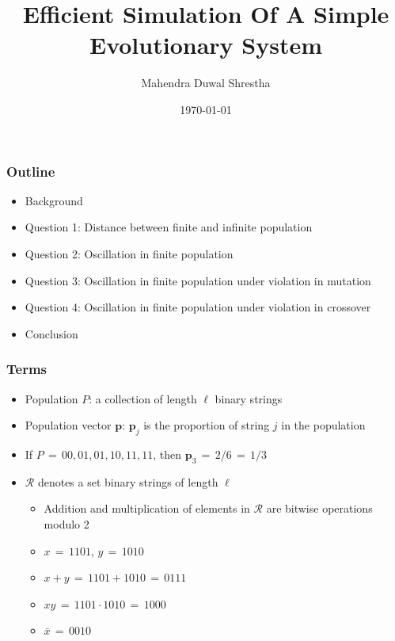 \documentclass[aspectratio=169]{beamer}
\title{Efficient Simulation Of A Simple Evolutionary System}
\author{Mahendra Duwal Shrestha}
\institute{The University Of Tenessee}
\date{\today}
\begin{document}
  \begin{frame}
    \titlepage
  \end{frame}

  \begin{frame}
    \frametitle{Outline}
    \begin{itemize}%
      \item{Background}
      \item{Question 1: Distance between finite and infinite population}
      \item{Question 2: Oscillation in finite population}
      \item{Question 3: Oscillation in finite population under violation in mutation}
      \item{Question 4: Oscillation in finite population under violation in crossover}
      \item{Conclusion}
    \end{itemize}
  \end{frame}

  \begin{frame}
    \frametitle{Terms}
    \begin{itemize}
      \item{Population $P$: a collection of length $\ell$ binary strings}
      \item{Population vector $\bm{p}$: $\bm{p}_j$ is the proportion of string $j$ in the population}
      \item{If $P \,=\, {00, 01, 01, 10, 11, 11}$, then $\bm{p}_3 \,=\, 2/6 \,=\, 1/3$}
      \item{$\mathcal{R}$ denotes a set binary strings of length $\ell$ }
      \begin{itemize}
	\item{Addition and multiplication of elements in $\mathcal{R}$ are bitwise operations modulo 2}
	\item{$x \,=\, 1101,\, y \,=\, 1010 $}
	\item{$x + y \,=\, 1101 + 1010 \,=\, 0111$}
	\item{$xy \,=\, 1101 \cdot 1010 \,=\, 1000$}
	\item{$\bar{x} \,=\, 0010$}
      \end{itemize}
    \end{itemize}
  \end{frame}
  
\end{document}
